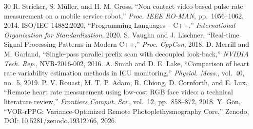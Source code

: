 \documentclass[9pt,technote,twocolumn,compsoc]{article}
\begin{document}
\begin{thebibliography}{30}
 R. Stricker, S. M\"uller, and H. M. Gross, ``Non-contact video-based pulse rate measurement on a mobile service robot,'' \textit{Proc. IEEE RO-MAN}, pp.~1056--1062, 2014.
 ISO/IEC 14882:2020, ``Programming Languages -- C++,'' \textit{International Organization for Standardization}, 2020.
 S. Vaughn and J. Lischner, ``Real-time Signal Processing Patterns in Modern C++,'' \textit{Proc. CppCon}, 2018.
 D. Merrill and M. Garland, ``Single-pass parallel prefix scan with decoupled look-back,'' \textit{NVIDIA Tech. Rep.}, NVR-2016-002, 2016.
 A. Smith and D. E. Lake, ``Comparison of heart rate variability estimation methods in ICU monitoring,'' \textit{Physiol. Meas.}, vol.~40, no.~5, 2019.
 P. V. Rouast, M. T. P. Adam, R. Chiong, D. Cornforth, and E. Lux, ``Remote heart rate measurement using low-cost RGB face video: a technical literature review,'' \textit{Frontiers Comput. Sci.}, vol.~12, pp.~858--872, 2018.
 Y. G\"on, ``VOR-rPPG: Variance-Optimized Remote Photoplethysmography Core,'' Zenodo, DOI: 10.5281/zenodo.19312766, 2026.
\end{thebibliography}
\end{document}
